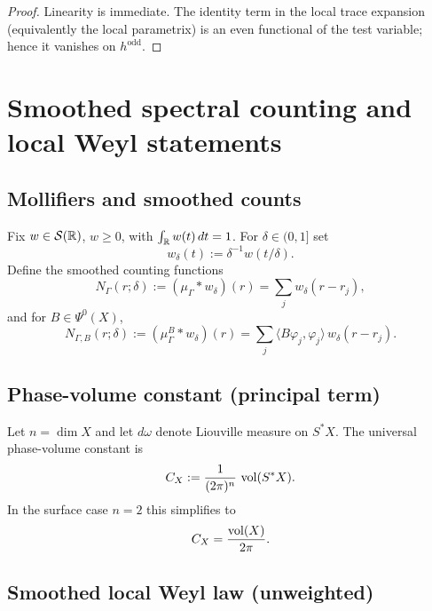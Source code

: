 \begin{proof}
Linearity is immediate. The identity term in the local trace expansion (equivalently the local parametrix)
is an even functional of the test variable; hence it vanishes on $h^{\mathrm{odd}}$.
\end{proof}

\section{Smoothed spectral counting and local Weyl statements}
\label{sec:09.smoothed-weyl}

\subsection{Mollifiers and smoothed counts}\label{subsec:09.smoothed-count}

Fix $w\in\mathcal S(\mathbb{R})$, $w\ge0$, with $\int_{\mathbb{R}} w(t)\,dt=1$. For $\delta\in(0,1]$ set
\[
w_\delta(t):=\delta^{-1}w(t/\delta).
\]
Define the smoothed counting functions
\begin{equation}\label{eq:09.N.smooth}
N_\Gamma(r;\delta):=(\mu_\Gamma*w_\delta)(r)=\sum_j w_\delta(r-r_j),
\end{equation}
and for $B\in\Psi^0(X)$,
\begin{equation}\label{eq:09.N.weighted}
N_{\Gamma,B}(r;\delta):=(\mu_\Gamma^{B}*w_\delta)(r)
=\sum_j \langle B\varphi_j,\varphi_j\rangle\,w_\delta(r-r_j).
\end{equation}

\subsection{Phase-volume constant (principal term)}\label{subsec:09.phase-volume}

Let $n=\dim X$ and let $d\omega$ denote Liouville measure on $S^*X$.
The universal phase-volume constant is
\begin{equation}\label{eq:09.CX.general}
C_X:=\frac{1}{(2\pi)^n}\,\mathop{\mathrm{vol}}\nolimits(S^*X).
\end{equation}
In the surface case $n=2$ this simplifies to
\begin{equation}\label{eq:09.CX.surface}
C_X=\frac{\mathop{\mathrm{vol}}\nolimits(X)}{2\pi}.
\end{equation}

\subsection{Smoothed local Weyl law (unweighted)}\label{subsec:09.statement}

